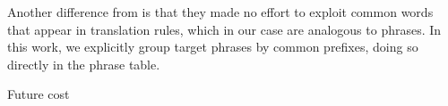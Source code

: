 \documentclass[11pt]{article}
\begin{document}
Another difference from  is that they made no effort to exploit common words that appear in translation rules, which in our case are analogous to phrases.  In this work, we explicitly group target phrases by common prefixes, doing so directly in the phrase table.  





Future cost \cite{pharaoh}




\end{document}
